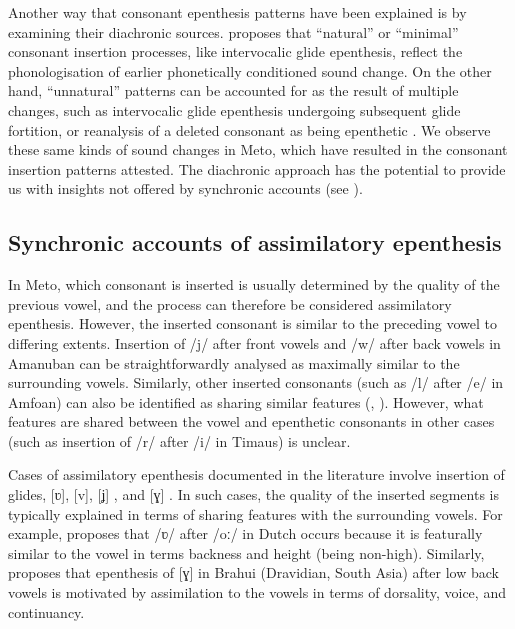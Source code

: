 \documentclass[output=paper]{langscibook}
\begin{document}
Another way that consonant epenthesis patterns 
have been explained is by
examining their diachronic sources.
\citet{bl08} proposes that ``natural'' or ``minimal''
consonant insertion processes, like intervocalic glide epenthesis,
reflect the phonologisation of earlier phonetically
conditioned sound change.
On the other hand, ``unnatural'' patterns can be accounted for as 
the result of multiple changes,
such as intervocalic glide epenthesis undergoing 
subsequent glide fortition,
or reanalysis of a deleted consonant as being epenthetic \citep{bl08}. 
We observe these same kinds of  sound changes in Meto, which have resulted
in the consonant insertion patterns attested.
The diachronic approach has the potential to
provide us with insights not offered by synchronic accounts (see ).

\subsection{Synchronic accounts of assimilatory epenthesis}\label{sec:DefineAsimEp}
In Meto, which consonant 
is inserted is usually determined
by the quality of the previous vowel,
and the process  can therefore be considered assimilatory epenthesis.
However, the inserted consonant is similar to the preceding vowel to differing extents. 
Insertion of /j/ after front vowels and /w/ after back vowels 
in Amanuban can be straightforwardly 
analysed as maximally similar to the surrounding vowels.
Similarly, other inserted consonants (such as /l/ after /e/ in Amfo{\Q}an)
can also be identified as sharing similar features (\cite[51]{cu18}, \cite{mo21}).
However, what features are shared between the vowel
and epenthetic consonants in other cases
(such as insertion of /r/ after /i/ in Timaus) is unclear.


Cases of assimilatory epenthesis documented in the literature
involve insertion of glides, 
[ʋ], [v], [ʝ] \citep[72]{mo12}, and [ɣ] \citep[80]{dl06}.
In such cases, the quality of the inserted segments is
typically explained in terms of sharing features
with the surrounding vowels. 
For example, \citet[56]{st14} proposes that 
/ʋ/ after /oː/ in Dutch occurs because it is 
featurally similar to the vowel
in terms  backness and height  (being non-high). Similarly,
\citet[80]{dl06} proposes that epenthesis
of [ɣ] in Brahui (Dravidian, South Asia) after low back vowels is motivated by 
assimilation to the vowels in terms of dorsality, voice, and continuancy. 
\end{document}
